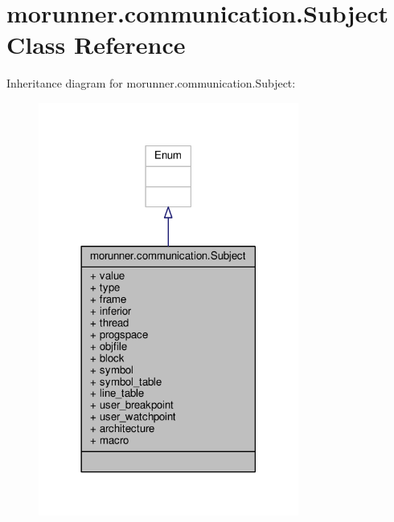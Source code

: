 \hypertarget{classmorunner_1_1communication_1_1Subject}{}\section{morunner.\+communication.\+Subject Class Reference}
\label{classmorunner_1_1communication_1_1Subject}


Inheritance diagram for morunner.\+communication.\+Subject\+:
\nopagebreak
\begin{figure}[H]
\begin{center}
\leavevmode
\includegraphics[width=242pt]{classmorunner_1_1communication_1_1Subject__inherit__graph}
\end{center}
\end{figure}



